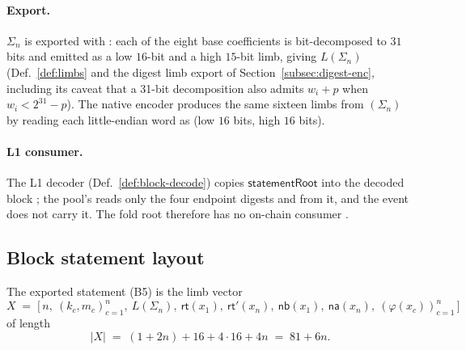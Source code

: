 \paragraph{Export.}
$\Sigma_n$ is exported with : each of the eight base
coefficients is bit-decomposed to $31$ bits and emitted as a low $16$-bit and a
high $15$-bit limb, giving $L(\Sigma_n)$ (Def.~\ref{def:limbs} and the digest limb
export of Section~\ref{subsec:digest-enc}, including its caveat that a 31-bit
decomposition also admits $w_i+p$ when $w_i < 2^{31}-p$).
The native encoder  produces the same sixteen limbs from
$(\Sigma_n)$ by reading each little-endian 
word as (low $16$ bits, high $16$ bits).

\paragraph{L1 consumer.}
The L1 decoder (Def.~\ref{def:block-decode}) copies $\mathsf{statementRoot}$ into
the decoded block ; the pool's 
reads only the four endpoint digests and  from it, and the
 event does not carry it.
The fold root therefore has no on-chain consumer .

\subsection{Block statement layout}
\label{subsec:block-stmt}

\begin{definition}
\label{def:block-stmt}
The exported statement (B5) is the limb vector
\begin{equation}
  X \;=\; \big[\, n,\ (k_c, m_c)_{c=1}^{n},\ L(\Sigma_n),\ \mathsf{rt}(x_1),\
  \mathsf{rt}'(x_n),\ \mathsf{nb}(x_1),\ \mathsf{na}(x_n),\ (\varphi(x_c))_{c=1}^{n} \,\big]
  \label{eq:block-stmt}
\end{equation}
of length
\begin{equation}
  |X| \;=\; (1+2n) + 16 + 4\cdot 16 + 4n \;=\; 81 + 6n .
\end{equation}
\end{definition}

